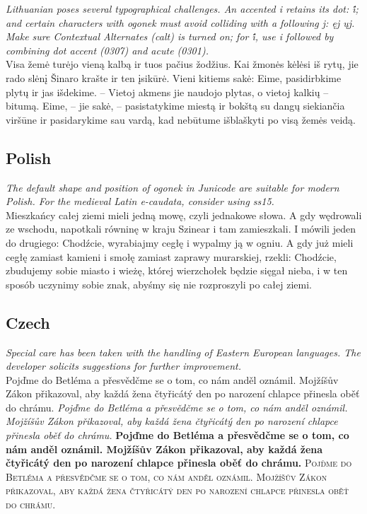 \documentclass[12pt,a4paper,openany]{book}
\begin{document}
{\small\itshape Lithuanian poses several typographical challenges. An
  accented i retains its dot: i̇́; and certain characters with ogonek
  must avoid colliding with a following j:
  {\upshape{} ęj ųj}. Make sure
  Contextual Alternates (calt) is turned on; for i̇́, use i followed
  by combining dot accent (0307) and acute (0301).}\\[1ex]
Visa žemė turėjo vieną kalbą ir tuos pačius žodžius.  Kai žmonės
kėlėsi iš rytų, jie rado slėnį Šinaro krašte ir ten įsikūrė.  Vieni
kitiems sakė: Eime, pasidirbkime plytų ir jas išdekime. – Vietoj
akmens jie naudojo plytas, o vietoj kalkių – bitumą.  Eime, – jie
sakė, – pasistatykime miestą ir bokštą su dangų siekiančia viršūne ir
pasidarykime sau vardą, kad nebūtume išblaškyti po visą žemės veidą.

\subsection*{Polish}
{\small\itshape The default shape and position of ogonek in Junicode are suitable
for modern Polish. For the medieval Latin e-caudata, consider using
ss15.}\\[1ex]
Mieszkańcy całej ziemi mieli jedną mowę, czyli jednakowe słowa.  A
gdy wędrowali ze wschodu, napotkali równinę w kraju Szinear i tam
zamieszkali.  I mówili jeden do drugiego: Chodźcie, wyrabiajmy cegłę
i wypalmy ją w ogniu. A gdy już mieli cegłę zamiast kamieni i smołę
zamiast zaprawy murarskiej, rzekli: Chodźcie, zbudujemy sobie miasto
i wieżę, której wierzchołek będzie sięgał nieba, i w ten sposób
uczynimy sobie znak, abyśmy się nie rozproszyli po całej ziemi.

\subsection*{Czech}
{\small\itshape Special care has been taken with the
  handling
of Eastern European languages. The developer solicits suggestions for
further improvement.}\\[1ex]
Pojďme do Betléma a přesvědčme
se o tom, co nám anděl oznámil. Mojžíšův Zákon přikazoval, aby každá
žena čtyřicátý den po narození chlapce přinesla oběť do chrámu.
{\itshape Pojďme do Betléma a přesvědčme
se o tom, co nám anděl oznámil. Mojžíšův Zákon přikazoval, aby každá
žena čtyřicátý den po narození chlapce přinesla oběť do chrámu.}
{\bfseries Pojďme do Betléma a přesvědčme
se o tom, co nám anděl oznámil. Mojžíšův Zákon přikazoval, aby každá
žena čtyřicátý den po narození chlapce přinesla oběť do chrámu.}
{\scshape Pojďme do Betléma a přesvědčme
se o tom, co nám anděl oznámil. Mojžíšův Zákon přikazoval, aby každá
žena čtyřicátý den po narození chlapce přinesla oběť do chrámu.}
\end{document}
